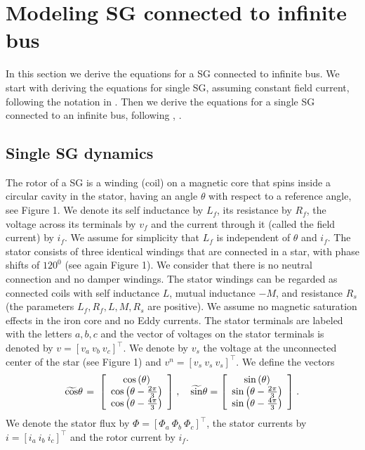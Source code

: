 \documentclass[conference]{IEEEtran}
\newcommand{\m}      {{\hbox{\hskip 1pt}}}
\begin{document}
\section{Modeling SG connected to infinite bus}

In this section we derive the equations for a SG connected to infinite
bus. We start with deriving the equations for single SG, assuming
constant field current, following the notation in \cite{ZhWe:11}. Then
we derive the equations for a single SG connected to an infinite bus,
following \cite{NaWe:14}, \cite{NaWe:15}.

\subsection{Single SG dynamics}

The rotor of a SG is a winding (coil) on a magnetic core that spins
inside a circular cavity in the stator, having an angle $\theta$ with
respect to a reference angle, see Figure 1. We denote its self
inductance by $L_f$, its resistance by $R_f$, the voltage across its
terminals by $v_f$ and the current through it (called the field
current) by $i_f$. We assume for simplicity that $L_f$ is independent
of $\theta$ and $i_f$. The stator consists of three identical windings
that are connected in a star, with phase shifts of $120^0$ (see again
Figure 1). We consider that there is no neutral connection and no
damper windings. The stator windings can be regarded as connected
coils with self inductance $L$, mutual inductance $-M$, and resistance
$R_s$ (the parameters $L_f,R_f,L,M,R_s$ are positive). We assume no
magnetic saturation effects in the iron core and no Eddy currents. The
stator terminals are labeled with the letters $a,b,c$ and the vector
of voltages on the stator terminals is denoted by $v=\left[v_a\ v_b\
v_c\right]^\top$. We denote by $v_s$ the voltage at the unconnected 
center of the star (see Figure 1) and $v^n=[v_s\ v_s\ v_s]^\top$.
We define the vectors
$$ \widetilde{\cos}\theta \m=\m \left[\begin{array}{c} \cos\left(
   \theta\right)\\ \cos\left(\theta-\frac{2\pi}{3}\right)\\
   \cos\left(\theta-\frac{4\pi}{3}\right) \end{array}\right] \m,\quad
   \widetilde{\sin}\theta=\left[\begin{array}{c} \sin\left(\theta
   \right)\\ \sin\left(\theta-\frac{2\pi}{3}\right)\\ \sin\left
   (\theta-\frac{4\pi}{3}\right) \end{array}\right] \m.$$
We denote the stator flux by $\Phi=\left[\Phi_a\ \Phi_b\ \Phi_c
\right]^\top$, the stator currents by $i=\left[i_a\ i_b\ i_c\right]
^\top$ and the rotor current by $i_f$. 
\end{document}
